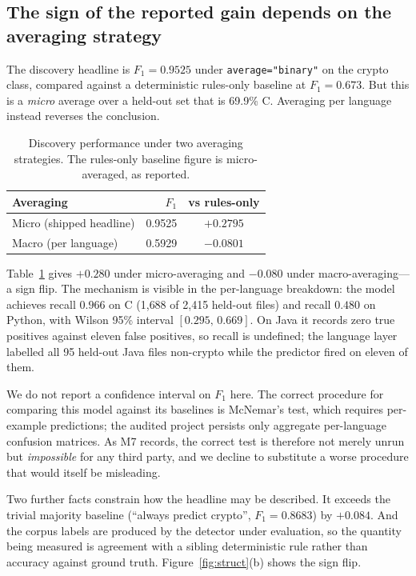 \documentclass[conference]{IEEEtran}
\newcommand{\code}[1]{\texttt{\small #1}}
\begin{document}
\subsection{The sign of the reported gain depends on the averaging strategy}

\label{sec:averaging}

The discovery headline is $F_1=0.9525$ under \code{average="binary"} on the crypto class,
compared against a deterministic rules-only baseline at $F_1=0.673$. But this is a
\emph{micro} average over a held-out set that is 69.9\% C. Averaging per language instead
reverses the conclusion.

\begin{table}[t]
\centering
\caption{Discovery performance under two averaging strategies. The rules-only baseline
figure is micro-averaged, as reported.}
\label{tab:averaging}
\begin{tabular}{@{}lrc@{}}
\toprule
\textbf{Averaging} & $F_1$ & vs rules-only \\
\midrule
Micro (shipped headline) & 0.9525 & $+0.2795$ \\
Macro (per language) & 0.5929 & $-0.0801$ \\
\bottomrule
\end{tabular}
\end{table}

Table~\ref{tab:averaging} gives $+0.280$ under micro-averaging and $-0.080$ under
macro-averaging---a sign flip. The mechanism is visible in the per-language breakdown: the
model achieves recall $0.966$ on C (1{,}688 of 2{,}415 held-out files) and recall $0.480$
on Python, with Wilson 95\% interval $[0.295,\,0.669]$. On Java it records zero true
positives against eleven false positives, so recall is undefined; the language layer
labelled all 95 held-out Java files non-crypto while the predictor fired on eleven of
them.

We do not report a confidence interval on $F_1$ here. The correct procedure for comparing
this model against its baselines is McNemar's test, which requires per-example predictions;
the audited project persists only aggregate per-language confusion matrices. As M7 records,
the correct test is therefore not merely unrun but \emph{impossible} for any third party,
and we decline to substitute a worse procedure that would itself be misleading.

Two further facts constrain how the headline may be described. It exceeds the trivial
majority baseline (``always predict crypto'', $F_1=0.8683$) by $+0.084$. And the corpus
labels are produced by the detector under evaluation, so the quantity being measured is
agreement with a sibling deterministic rule rather than accuracy against ground truth.
Figure~\ref{fig:struct}(b) shows the sign flip.
\end{document}
